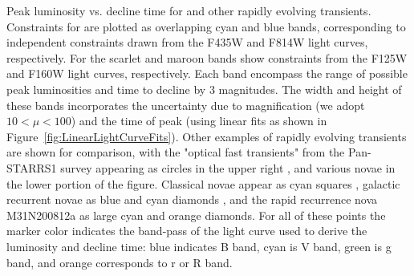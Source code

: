 Peak luminosity vs. decline time for \spock and other rapidly evolving transients.  Constraints for \spockone are plotted as overlapping cyan and blue bands, corresponding to independent constraints drawn from the F435W and F814W light curves, respectively.  For \spocktwo the scarlet and maroon bands show constraints from the F125W and F160W light curves, respectively.  Each band encompass the range of possible peak luminosities and time to decline by 3 magnitudes. The width and height of these bands incorporates the uncertainty due to magnification (we adopt $10<\mu<100$) and the time of peak (using linear fits as shown in Figure~\ref{fig:LinearLightCurveFits}).   Other examples of rapidly evolving transients are shown for comparison, with the "optical fast transients" from the Pan-STARRS1 survey appearing as circles in the upper right \citep{Drout:2014a}, and various novae in the lower portion of the figure. Classical novae appear as cyan squares \citep{Downes:2000}, galactic recurrent novae as blue and cyan diamonds \citep{Schaefer:2010}, and the rapid recurrence nova M31N200812a as large cyan and orange diamonds.  For all of these points the marker color indicates the band-pass of the light curve used to derive the luminosity and decline time: blue indicates B band, cyan is V band, green is g band, and orange corresponds to r or R band.
\label{fig:PeakLuminosityDeclineTime}